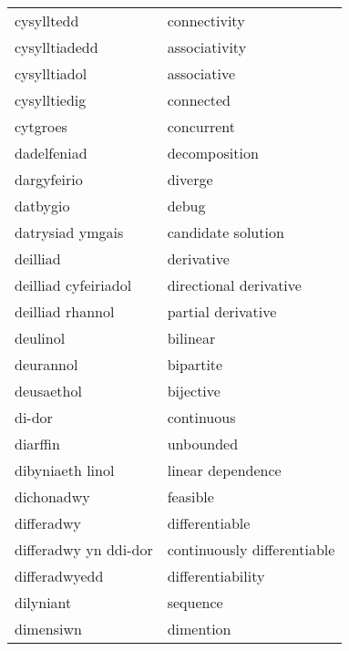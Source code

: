 \begin{supertabular}{p{0.22\textwidth}p{0.22\textwidth}}
                      cysylltedd &                      connectivity \\
                   cysylltiadedd &                     associativity \\
                    cysylltiadol &                       associative \\
                    cysylltiedig &                         connected \\
                        cytgroes &                        concurrent \\
                     dadelfeniad &                     decomposition \\
                     dargyfeirio &                           diverge \\
                        datbygio &                             debug \\
                datrysiad ymgais &                candidate solution \\
                        deilliad &                        derivative \\
            deilliad cyfeiriadol &            directional derivative \\
                deilliad rhannol &                partial derivative \\
                        deulinol &                          bilinear \\
                       deurannol &                         bipartite \\
                      deusaethol &                         bijective \\
                          di-dor &                        continuous \\
                        diarffin &                         unbounded \\
                dibyniaeth linol &                 linear dependence \\
                      dichonadwy &                          feasible \\
                      differadwy &                    differentiable \\
           differadwy yn ddi-dor &       continuously differentiable \\
                   differadwyedd &                 differentiability \\
                       dilyniant &                          sequence \\
                       dimensiwn &                         dimention \\

\end{supertabular}

